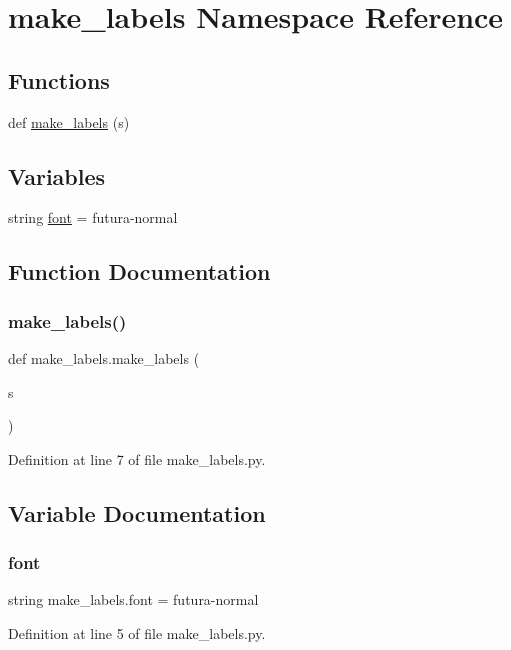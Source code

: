 \hypertarget{namespacemake__labels}{}\section{make\+\_\+labels Namespace Reference}
\label{namespacemake__labels}
\subsection*{Functions}
\begin{DoxyCompactItemize}
\item 
def \mbox{\hyperlink{namespacemake__labels_a59a6be9cc3c1e6d624e87425d6e0b592}{make\+\_\+labels}} (s)
\end{DoxyCompactItemize}
\subsection*{Variables}
\begin{DoxyCompactItemize}
\item 
string \mbox{\hyperlink{namespacemake__labels_a5adbbe2d0f4bd88d6e2dde06d28500f1}{font}} = \textquotesingle{}futura-\/normal\textquotesingle{}
\end{DoxyCompactItemize}


\subsection{Function Documentation}
\mbox{\label{namespacemake__labels_a59a6be9cc3c1e6d624e87425d6e0b592}} 
\subsubsection{\texorpdfstring{make\_labels()}{make\_labels()}}
{\footnotesize\ttfamily def make\+\_\+labels.\+make\+\_\+labels (\begin{DoxyParamCaption}\item[{}]{s }\end{DoxyParamCaption})}



Definition at line 7 of file make\+\_\+labels.\+py.



\subsection{Variable Documentation}
\mbox{\label{namespacemake__labels_a5adbbe2d0f4bd88d6e2dde06d28500f1}} 
\subsubsection{\texorpdfstring{font}{font}}
{\footnotesize\ttfamily string make\+\_\+labels.\+font = \textquotesingle{}futura-\/normal\textquotesingle{}}



Definition at line 5 of file make\+\_\+labels.\+py.

